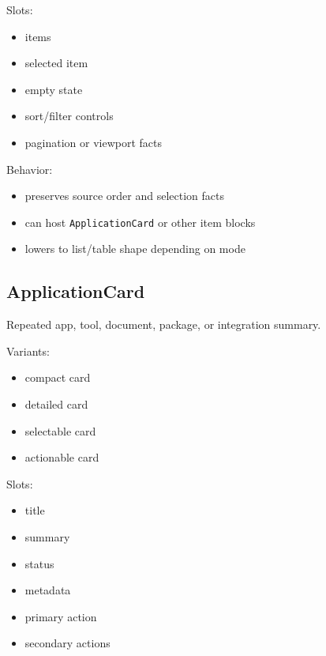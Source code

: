 Slots:

\begin{itemize}
\tightlist
\item
  items
\item
  selected item
\item
  empty state
\item
  sort/filter controls
\item
  pagination or viewport facts
\end{itemize}

Behavior:

\begin{itemize}
\tightlist
\item
  preserves source order and selection facts
\item
  can host \texttt{A\allowbreak{}p\allowbreak{}p\allowbreak{}l\allowbreak{}i\allowbreak{}c\allowbreak{}a\allowbreak{}t\allowbreak{}i\allowbreak{}o\allowbreak{}n\allowbreak{}C\allowbreak{}a\allowbreak{}r\allowbreak{}d} or other item blocks
\item
  lowers to list/table shape depending on mode
\end{itemize}

\subsection{ApplicationCard}\label{record-128-applicationcard}

Repeated app, tool, document, package, or integration summary.

Variants:

\begin{itemize}
\tightlist
\item
  compact card
\item
  detailed card
\item
  selectable card
\item
  actionable card
\end{itemize}

Slots:

\begin{itemize}
\tightlist
\item
  title
\item
  summary
\item
  status
\item
  metadata
\item
  primary action
\item
  secondary actions
\end{itemize}

